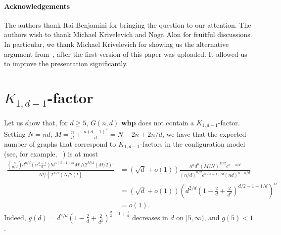 \documentclass[notitlepage]{scrartcl}
\begin{document}

\paragraph{Acknowledgements} The authors thank Itai Benjamini for bringing the question to our attention. The authors wish to thank Michael Krivelevich and Noga Alon for fruitful discussions. In particular, we thank Michael Krivelevich for showing us the alternative argument from~\cite{DK}, after the first version of this paper was uploaded. It allowed us to improve the presentation significantly.


    



\appendix
\section[d-1-star-factor]{$K_{1,d-1}$-factor}
\label{appendix}
Let us show that, for $d\ge 5$, $G(n,d)$ \textbf{whp} does not contain a $K_{1,d-1}$-factor. Setting $N=nd$, $M=\frac{n}{d}+\frac{n(d-1)^2}{d}=N-2n+2n/d$, we have that the expected number of graphs that correspond to $K_{1,d-1}$-factors in the configuration model (see, for example, ~\cite{Bol_book}) is at most
\begin{align*}
    \frac{\binom{n}{n/d}d^{n/d}(n\frac{d-1}{d})!d^{n(d-1)/d}M!/(2^{M/2}(M/2)!}{N!/(2^{N/2}(N/2)!)}&=\left(\sqrt{d}+o(1)\right)\frac{n^nd^n(M/N)^{M/2}e^{n-n/d}}{(n/d)^{n/d}e^{n(d-1)/d}(nd)^{n-n/d}}\\
    &=\left(\sqrt{d}+o(1)\right)\left(d^{2/d}\left(1-\frac{2}{d}+\frac{2}{d^2}\right)^{d/2-1+1/d}\right)^n\\
    &=o(1).
\end{align*}
Indeed, $g(d)=d^{2/d}\left(1-\frac{2}{d}+\frac{2}{d^2}\right)^{\frac{d}{2}-1+\frac{1}{d}}$ decreases in $d$ on $[5,\infty)$, and $g(5)<1$.
\end{document}
